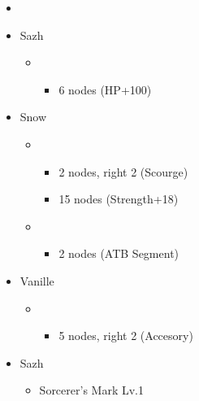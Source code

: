 \begin{menu}
	\begin{itemize}
		\paradigm
		\begin{itemize}
			\item {}%
				  {\paradigmline{\syn}{(\rav)}{(\sab)}}%
			      {\paradigmline{\com}{\rav}{\rav}}%
			      {\paradigmline[4]{\rav}{\sen}{(\med)}}%
			      {\paradigmline{\com}{(\sen)}{(\med)}}%
			      {\paradigmline{\rav}{(\rav)}{\sab}}%
			      {\paradigmline{\com}{(\rav)}{(\med)}}%
		\end{itemize}
		\crystarium
		\begin{itemize}
			\item Sazh
				\begin{itemize}
					\item \rav
						\begin{itemize}
							\item 6 nodes (HP+100)
						\end{itemize}
				\end{itemize}
			\item Snow
				\begin{itemize}
					\item \com
						\begin{itemize}
							\item 2 nodes, right 2 (Scourge)
							\item 15 nodes (Strength+18)
						\end{itemize}
					\item \sen
						\begin{itemize}
							\item 2 nodes (ATB Segment)
						\end{itemize}
				\end{itemize}
			\item Vanille
				\begin{itemize}
					\item \med
						\begin{itemize}
							\item 5 nodes, right 2 (Accesory)
						\end{itemize}
				\end{itemize}							      	
		\end{itemize}
		\equip
		\begin{itemize}
			\item Sazh
				\begin{itemize}
					\item Sorcerer's Mark Lv.1

\end{itemize}
\end{itemize}
\end{itemize}
\end{menu}
